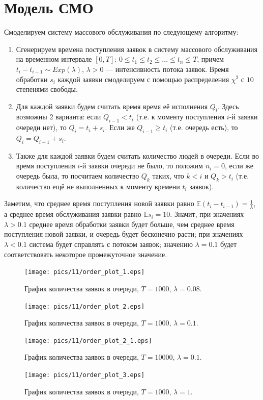 \documentclass[11pt]{article}
\begin{document}
\section{Модель СМО}
Смоделируем систему массового обслуживания по следующему алгоритму:
\begin{enumerate}
\item Сгенерируем времена поступления заявок в систему массового обслуживания на временном интервале $[0, T]$: $0 \leqslant t_1 \leqslant t_2 \leqslant \ldots \leqslant t_n \leqslant T$, причем $t_i-t_{i-1} \sim Exp(\lambda)$, $\lambda > 0$ --- интенсивность потока заявок. Время обработки $s_i$ каждой заявки смоделируем с помощью распределения $\chi^2$ с $10$ степенями свободы.
\item Для каждой заявки будем считать время время её исполнения $Q_i$. Здесь возможны 2 варианта: если $Q_{i-1} < t_i$ (т.е. к моменту поступления $i$-й заявки очереди нет), то $Q_i = t_i + s_i$. Если же $Q_{i-1} \geqslant t_i$ (т.е. очередь есть), то $Q_i = Q_{i-1} + s_i$.
\item Также для каждой заявки будем считать количество людей в очереди. Если во время поступления $i$-й заявки очереди не было, то положим $n_i = 0$, если же очередь была, то посчитаем количество $Q_k$ таких, что $k < i$ и $Q_k > t_i$ (т.е. количество ещё не выполненных к моменту времени $t_i$ заявок).
\end{enumerate}

Заметим, что среднее время поступления новой заявки равно $\mathbb{E}(t_i - t_{i-1}) = \tfrac{1}{\lambda}$, а среднее время обслуживания заявки равно $\mathbb{E}s_i = 10$. Значит, при значениях $\lambda > 0.1$ среднее время обработки заявки будет больше, чем среднее время поступления новой заявки, и очередь будет бесконечно расти; при значениях $\lambda < 0.1$ система будет справлять с потоком заявок; значению $\lambda = 0.1$ будет соответствовать некоторое промежуточное значение.
\begin{figure}[h!]
	\centering
	\texttt{[image: pics/11/order\_plot\_1.eps]}
	\caption{График количества заявок в очереди, $T = 1000$, $\lambda = 0.08$.}
\end{figure}
\begin{figure}[h!]
	\centering
	\texttt{[image: pics/11/order\_plot\_2.eps]}
	\caption{График количества заявок в очереди, $T = 1000$, $\lambda = 0.1$.}
\end{figure}
\begin{figure}[h!]
	\centering
	\texttt{[image: pics/11/order\_plot\_2\_1.eps]}
	\caption{График количества заявок в очереди, $T = 10000$, $\lambda = 0.1$.}
\end{figure}
\begin{figure}[h!]
	\centering
	\texttt{[image: pics/11/order\_plot\_3.eps]}
	\caption{График количества заявок в очереди, $T = 1000$, $\lambda = 1$.}
\end{figure}
\pagebreak
\end{document}
